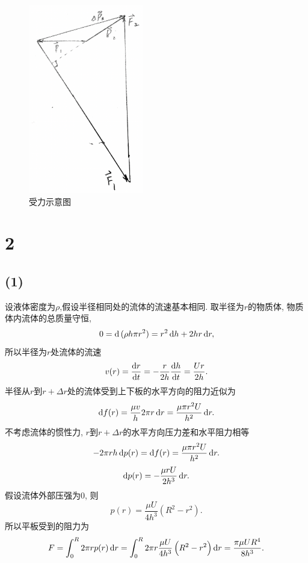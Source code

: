 \documentclass[12pt]{article}
\begin{document}
\begin{figure}[htp]
	\centering
	\includegraphics[width=5cm]{12.png}
	\caption{受力示意图}
	\label{fig:12}
\end{figure}

\section{2}

\subsection{(1)}

设液体密度为$\rho$,假设半径相同处的流体的流速基本相同. 取半径为$r$的物质体, 物质体内流体的总质量守恒,
\begin{equation}
	0 = \dif \ (\rho h \pi r^2) = r^2\dif h + 2hr\dif r,
\end{equation}
所以半径为$r$处流体的流速
\begin{equation}
	v(r) = \frac{\dif r}{\dif t} = - \frac{r}{2h} \frac{\dif h}{\dif t} = \frac{Ur}{2h}.
\end{equation}
半径从$r$到$r+\Delta r$处的流体受到上下板的水平方向的阻力近似为
\begin{equation}
	\dif f(r) = \frac{\mu v}{h} 2\pi r \dif r = \frac{\mu \pi r^2U}{h^2}\dif r.
\end{equation}
不考虑流体的惯性力, $r$到$r+\Delta r$的水平方向压力差和水平阻力相等
\begin{equation}
	-2\pi rh\dif p(r) = \dif f(r) = \frac{\mu \pi r^2U}{h^2}\dif r.
\end{equation}
\begin{equation}
	\dif p(r) = - \frac{\mu rU}{2h^3}\dif r.
\end{equation}
假设流体外部压强为0, 则
\begin{equation}
	p(r) = \frac{\mu U}{4h^3}\left(R^2-r^2\right).
\end{equation}
所以平板受到的阻力为
\begin{equation}
	F = \int_0^R 2\pi r p(r) \dif r = \int_0^R 2\pi r \frac{\mu U}{4h^3}\left(R^2-r^2\right) \dif r = \frac{\pi \mu U R^4}{8h^3}.
\end{equation}
\end{document}
